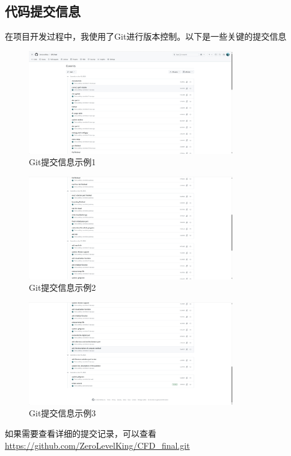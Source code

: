 \documentclass[UTF8]{ctexart}
\begin{document}
\subsection{代码提交信息}
在项目开发过程中，我使用了Git进行版本控制。以下是一些关键的提交信息
\begin{figure}
    \centering
    \includegraphics[width=0.8\textwidth]{c1.png}
    \caption{Git提交信息示例1}
    \label{fig:git_commit_info1}
\end{figure}
\begin{figure}
    \centering
    \includegraphics[width=0.8\textwidth]{c2.png}
    \caption{Git提交信息示例2}
    \label{fig:git_commit_info2}
\end{figure}
\begin{figure}
    \centering
    \includegraphics[width=0.8\textwidth]{c3.png}
    \caption{Git提交信息示例3}
    \label{fig:git_commit_info3}
\end{figure}
如果需要查看详细的提交记录，可以查看 \url{https://github.com/ZeroLevelKing/CFD_final.git}
\end{document}
